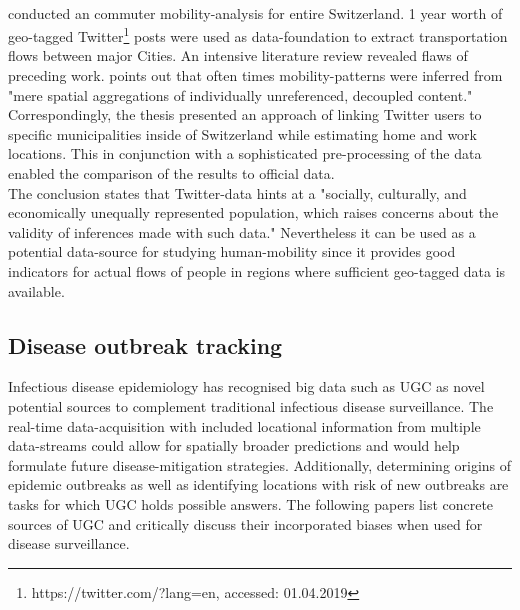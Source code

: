 \paragraph*{\textcite{Grossenbacher2014}} conducted an commuter mobility-analysis for entire Switzerland. 1 year worth of geo-tagged Twitter\footnote{https://twitter.com/?lang=en, accessed: 01.04.2019} posts were used as data-foundation to extract transportation flows between major Cities. An intensive literature review revealed flaws of preceding work. \citeauthor{Grossenbacher2014} points out that often times mobility-patterns were inferred from "mere spatial aggregations of individually unreferenced, decoupled content." Correspondingly, the thesis presented an approach of linking Twitter users to specific municipalities inside of Switzerland while estimating home and work locations. This in conjunction with a sophisticated pre-processing of the data enabled the comparison of the results to official data.\\
The conclusion states that Twitter-data hints at a "socially, culturally, and economically unequally represented population, which raises concerns about the validity of inferences made with such data." Nevertheless it can be used as a potential data-source for studying human-mobility since it provides good indicators for actual flows of people in regions where sufficient geo-tagged data is available.

\subsection{Disease outbreak tracking}
Infectious disease epidemiology has recognised big data such as UGC as novel potential sources to complement traditional infectious disease surveillance. The real-time data-acquisition with included locational information from multiple data-streams could allow for spatially broader predictions and would help formulate future disease-mitigation strategies. Additionally, determining origins of epidemic outbreaks as well as identifying locations with risk of new outbreaks are tasks for which UGC holds possible answers. The following papers list concrete sources of UGC and critically discuss their incorporated biases when used for disease surveillance.\\

\newline

